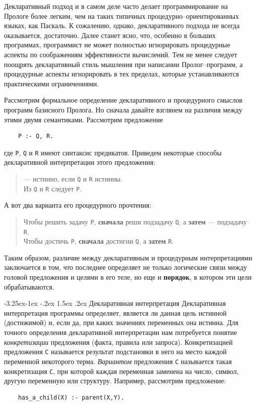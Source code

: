\documentclass[12pt, openany, twoside]{book} %
\makeatletter
\renewcommand\subsection{\@startsection{subsection}{2}{\z@}%
                                     {-3.25ex\@plus -1ex \@minus -.2ex}%
                                     {1.5ex \@plus .2ex}%
                                     {\normalfont\normalsize\bfseries}}
\makeatother
\begin{document}
Декларативный подход и в самом деле часто делает программирование на Прологе более легким, чем на таких типичных процедур\-но--ориентированных языках, как Паскаль. К сожалению, однако, декларативного подхода не всегда оказывается, достаточно. Далее станет ясно, что, особенно в больших программах, программист не может полностью игнорировать процедурные аспекты по соображениям эффективности вычислений. Тем не менее следует поощрять декларативный стиль мышления при написании Пролог--программ, а процедурные аспекты игнорировать в тех пределах, которые устанавливаются практическими ограничениями.

Рассмотрим формальное определение декларативного и процедурного смыслов программ базисного Пролога. Но сначала давайте взглянем на различия между этими двумя семантиками. Рассмотрим предложение
{\tt\begin{verbatim}
    Р :- Q, R.
\end{verbatim}}
\noindent где {\tt Р}, {\tt Q} и {\tt R} имеют синтаксис предикатов. Приведем некоторые способы декларативной интерпретации этого предложения:
\begin{quote}
 --- истинно, если {\tt Q} и {\tt R} истинны. \\
Из {\tt Q} и {\tt R} следует {\tt Р}.
\end{quote}

\noindent А вот два варианта его процедурного прочтения:

\begin{quote}
\noindent Чтобы решить задачу {\tt Р}, \textbf{сначала} реши подзадачу {\tt Q}, а {\bf затем} --- подзадачу {\tt R}. \\
Чтобы достичь {\tt Р}, \textbf{сначала} достигни {\tt Q},
а \textbf{затем} {\tt R}.
\end{quote}

Таким образом, различие между декларативным и процедурным интерпретациями заключается в том, что последнее определяет не только логические связи между головой предложения и целями в его теле, но еще и {\bf порядок}, в котором эти цели обрабатываются.

\subsection{Декларативная интерпретация}
Декларативная интерпретация программы определяет, является ли данная цель истинной (достижимой) и, если да, при каких значениях переменных она истинна. Для точного определения декларативной интерпретации нам потребуется понятие \emph{конкретизации} предложения (факта, правила или запроса). Конкретизацией предложения {\tt С} называется результат подстановки в него на место каждой переменной некоторого терма. \emph{Вариантом} предложения {\tt С} называется такая конкретизация {\tt С}, при которой каждая переменная заменена на число, символ, другую переменную или структуру. Например, рассмотрим предложение:
{\tt\begin{verbatim}
    has_a_child(X) :- parent(X,Y).
\end{verbatim}}
\end{document}
